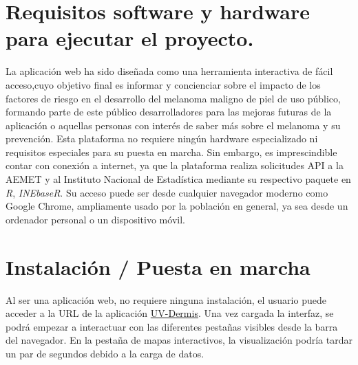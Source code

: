 
\section{Requisitos software y hardware para ejecutar el proyecto.}
La aplicación web ha sido diseñada como una herramienta interactiva de fácil acceso,cuyo objetivo final es informar y concienciar sobre el impacto de los factores de riesgo en el desarrollo del melanoma maligno de piel de uso público, formando parte de este público desarrolladores para las mejoras futuras de la aplicación o aquellas  personas con interés de saber más sobre el melanoma y su prevención.
Esta plataforma no requiere ningún hardware especializado ni requisitos especiales para su puesta en marcha.
Sin embargo, es imprescindible contar con conexión a internet, ya que la plataforma realiza solicitudes API a la AEMET y al Instituto Nacional de Estadística mediante su respectivo paquete en \textit{R}, \textit{ INEbaseR}. Su acceso puede ser desde cualquier navegador moderno como Google Chrome, ampliamente usado por la población en general, ya sea desde un ordenador personal o un dispositivo móvil.  


\section{Instalación / Puesta en marcha}

Al ser una aplicación web, no requiere ninguna instalación, el usuario puede acceder a la URL de la aplicación \href{ https://nfarla02.shinyapps.io/UV-Dermis/}{UV-Dermis}. Una vez cargada la interfaz, se podrá empezar a interactuar con las diferentes pestañas visibles desde la barra del navegador. En la pestaña de mapas interactivos, la visualización podría tardar un par de segundos debido a la carga de datos. 

